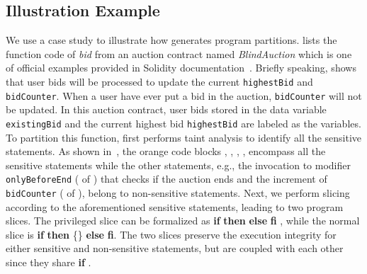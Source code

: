\subsection{Illustration Example}
\label{sec:illustration}
We use a case study to illustrate how \tool generates program partitions.
 lists the function code of \textit{bid} from an auction contract named \textit{BlindAuction} which is one of official examples provided in Solidity documentation~\cite{solidity}.
Briefly speaking,  shows that user bids will be processed to update the current \texttt{highestBid} and \texttt{bidCounter}.
When a user have ever put a bid in the auction, \texttt{bidCounter} will not be updated.
In this auction contract, user bids stored in the data variable \texttt{existingBid} and the current highest bid \texttt{highestBid} are labeled as the \secrete variables.
To partition this function,
\tool first performs taint analysis to identify all the sensitive statements.
As shown in~, the \textcolor{academicred}{orange} code blocks , , , , \color{black}{and}  \color{black}{}encompass all the sensitive statements while the other statements, e.g., the invocation to modifier \texttt{onlyBeforeEnd} (\color{black}{} of ) that checks if the auction ends and the increment of \texttt{bidCounter} (\color{black}{} of ), belong to non-sensitive statements.  
Next, we perform slicing according to the aforementioned sensitive statements, leading to two program slices.
The privileged slice can be formalized as   \color{black}{}\textbf{if}  \color{black}{}\textbf{then}  \color{black}{}\textbf{else}  \color{black}{}\textbf{fi} ,\color{black}{} while the normal slice is   \color{black}{}\textbf{if}  \color{black}{}\textbf{then} \{\} \color{black}{}\textbf{else}  \color{black}{}\textbf{fi}.
\color{black}{}The two slices preserve the execution integrity for either sensitive and non-sensitive statements, but are coupled with each other since they share   \color{black}{}\textbf{if} .
